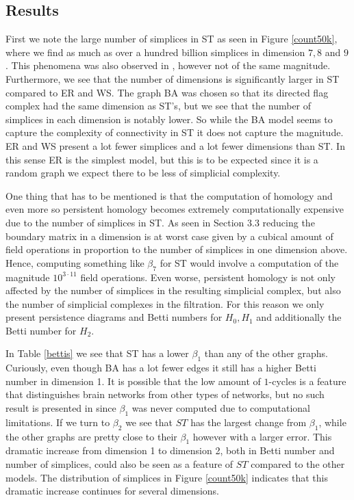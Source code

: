 \subsection{Results}
First we note the large number of simplices in ST as seen in Figure \ref{count50k}, where we find as much as over a hundred billion simplices in dimension $7,8$ and $9$. This phenomena was also observed in \cite{reimann}, however not of the same magnitude.  Furthermore, we see that the number of dimensions is significantly larger in ST compared to ER and WS. The graph BA was chosen so that its directed flag complex had the same dimension as ST's, but we see that the number of simplices in each dimension is notably lower. So while the BA model seems to capture the complexity of connectivity in ST it does not capture the magnitude. ER and WS present a lot fewer simplices and a lot fewer dimensions than ST. In this sense ER is the simplest model, but this is to be expected since it is a random graph we expect there to be less of simplicial complexity.

One thing that has to be mentioned is that the computation of homology and even more so persistent homology becomes extremely computationally expensive due to the number of simplices in ST. As seen in Section 3.3 reducing the boundary matrix in a dimension is at worst case given by a cubical amount of field operations in proportion to the number of simplices in one dimension above. Hence, computing something like $\beta_{7}$ for ST would involve a computation of the magnitude $10^{3 \cdot 11}$ field operations. Even worse, persistent homology is not only affected by the number of simplices in the resulting simplicial complex, but also the number of simplicial complexes in the filtration. For this reason we only present persistence diagrams and Betti numbers for $H_{0},H_{1}$ and additionally the Betti number for $H_{2}$.

In Table \ref{bettis} we see that ST has a lower $\beta_{1}$ than any of the other graphs. Curiously, even though BA has a lot fewer edges it still has a higher Betti number in dimension 1. It is possible that the low amount of $1$-cycles is a feature that distinguishes brain networks from other types of networks, but no such result is presented in \cite{reimann} since $\beta_{1}$ was never computed due to computational limitations. If we turn to $\beta_{2}$ we see that $ST$ has the largest change from $\beta_{1}$, while the other graphs are pretty close to their $\beta_{1}$ however with a larger error. This dramatic increase from dimension 1 to dimension 2, both in Betti number and number of simplices, could also be seen as a feature of $ST$ compared to the other models. The distribution of simplices in Figure \ref{count50k} indicates that this dramatic increase continues for several dimensions.

